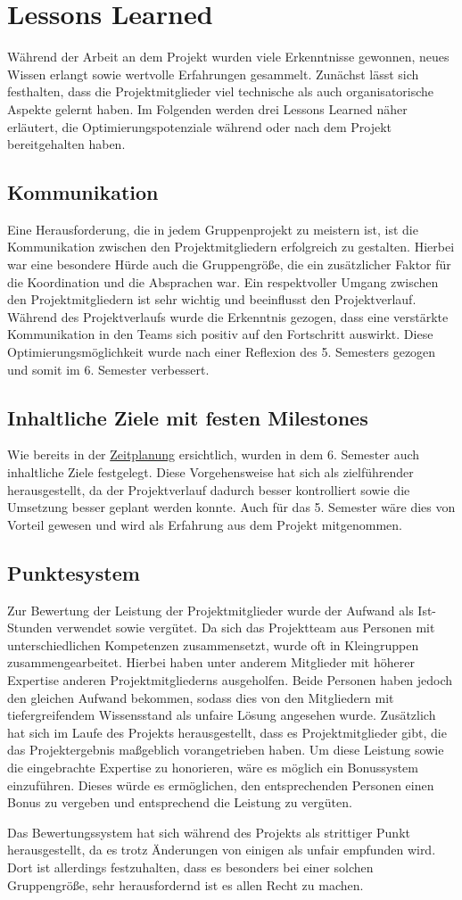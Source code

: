 \section{Lessons Learned}
Während der Arbeit an dem Projekt wurden viele Erkenntnisse gewonnen, neues Wissen erlangt sowie wertvolle Erfahrungen gesammelt.
Zunächst lässt sich festhalten, dass die Projektmitglieder viel technische als auch organisatorische Aspekte gelernt haben.
Im Folgenden werden drei Lessons Learned näher erläutert, die Optimierungspotenziale während oder nach dem Projekt bereitgehalten haben.
\subsection{Kommunikation}
Eine Herausforderung, die in jedem Gruppenprojekt zu meistern ist, ist die Kommunikation zwischen den Projektmitgliedern erfolgreich zu gestalten. 
Hierbei war eine besondere Hürde auch die Gruppengröße, die ein zusätzlicher Faktor für die Koordination und die Absprachen war. 
Ein respektvoller Umgang zwischen den Projektmitgliedern ist sehr wichtig und beeinflusst den Projektverlauf.
Während des Projektverlaufs wurde die Erkenntnis gezogen, dass eine verstärkte Kommunikation in den Teams sich positiv auf den Fortschritt auswirkt. 
Diese Optimierungsmöglichkeit wurde nach einer Reflexion des 5. Semesters gezogen und somit im 6. Semester verbessert. 

\subsection{Inhaltliche Ziele mit festen Milestones}
Wie bereits in der \hyperref[ch:zeitplanung]{Zeitplanung} ersichtlich, wurden in dem 6. Semester auch inhaltliche Ziele festgelegt. 
Diese Vorgehensweise hat sich als zielführender herausgestellt, da der Projektverlauf dadurch besser kontrolliert sowie die Umsetzung besser geplant werden konnte.
Auch für das 5. Semester wäre dies von Vorteil gewesen und wird als Erfahrung aus dem Projekt mitgenommen.

\subsection{Punktesystem}
Zur Bewertung der Leistung der Projektmitglieder wurde der Aufwand als Ist-Stunden verwendet sowie vergütet.
Da sich das Projektteam aus Personen mit unterschiedlichen Kompetenzen zusammensetzt, wurde oft in Kleingruppen zusammengearbeitet. 
Hierbei haben unter anderem Mitglieder mit höherer Expertise anderen Projektmitgliederns ausgeholfen.
Beide Personen haben jedoch den gleichen Aufwand bekommen, sodass dies von den Mitgliedern mit tiefergreifendem Wissensstand als unfaire Lösung angesehen wurde. 
Zusätzlich hat sich im Laufe des Projekts herausgestellt, dass es Projektmitglieder gibt, die das Projektergebnis maßgeblich vorangetrieben haben.
Um diese Leistung sowie die eingebrachte Expertise zu honorieren, wäre es möglich ein Bonussystem einzuführen. 
Dieses würde es ermöglichen, den entsprechenden Personen einen Bonus zu vergeben und entsprechend die Leistung zu vergüten.

Das Bewertungssystem hat sich während des  Projekts als strittiger Punkt herausgestellt, da es trotz Änderungen von einigen als unfair empfunden wird.
Dort ist allerdings festzuhalten, dass es besonders bei einer solchen Gruppengröße, sehr herausfordernd ist es allen Recht zu machen.